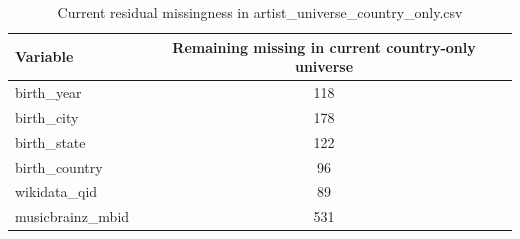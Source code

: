 \begin{table}[H]
\centering
\caption{Current residual missingness in artist\_universe\_country\_only.csv}
\label{tab:missingness}
\begin{tabular}{lc}
\toprule
Variable & Remaining missing in current country-only universe \\
\midrule
birth\_year & 118 \\
birth\_city & 178 \\
birth\_state & 122 \\
birth\_country & 96 \\
wikidata\_qid & 89 \\
musicbrainz\_mbid & 531 \\
\bottomrule
\end{tabular}
\end{table}
